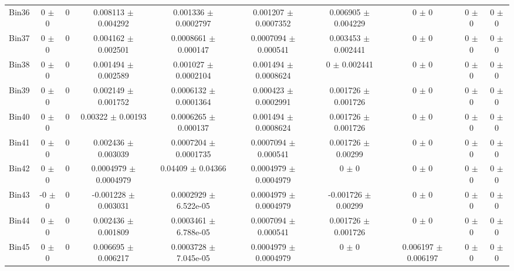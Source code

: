 \begin{tabular}{@{\extracolsep{4pt}}lccccccccc@{}}
     Bin36 & 0 $\pm$ 0 & 0 & 0.008113 $\pm$ 0.004292 & 0.001336 $\pm$ 0.0002797 & 0.001207 $\pm$ 0.0007352 & 0.006905 $\pm$ 0.004229 & 0 $\pm$ 0 & 0 $\pm$ 0 & 0 $\pm$ 0 \\ 
     Bin37 & 0 $\pm$ 0 & 0 & 0.004162 $\pm$ 0.002501 & 0.0008661 $\pm$ 0.000147 & 0.0007094 $\pm$ 0.000541 & 0.003453 $\pm$ 0.002441 & 0 $\pm$ 0 & 0 $\pm$ 0 & 0 $\pm$ 0 \\ 
     Bin38 & 0 $\pm$ 0 & 0 & 0.001494 $\pm$ 0.002589 & 0.001027 $\pm$ 0.0002104 & 0.001494 $\pm$ 0.0008624 & 0 $\pm$ 0.002441 & 0 $\pm$ 0 & 0 $\pm$ 0 & 0 $\pm$ 0 \\ 
     Bin39 & 0 $\pm$ 0 & 0 & 0.002149 $\pm$ 0.001752 & 0.0006132 $\pm$ 0.0001364 & 0.000423 $\pm$ 0.0002991 & 0.001726 $\pm$ 0.001726 & 0 $\pm$ 0 & 0 $\pm$ 0 & 0 $\pm$ 0 \\ 
     Bin40 & 0 $\pm$ 0 & 0 & 0.00322 $\pm$ 0.00193 & 0.0006265 $\pm$ 0.000137 & 0.001494 $\pm$ 0.0008624 & 0.001726 $\pm$ 0.001726 & 0 $\pm$ 0 & 0 $\pm$ 0 & 0 $\pm$ 0 \\ 
     Bin41 & 0 $\pm$ 0 & 0 & 0.002436 $\pm$ 0.003039 & 0.0007204 $\pm$ 0.0001735 & 0.0007094 $\pm$ 0.000541 & 0.001726 $\pm$ 0.00299 & 0 $\pm$ 0 & 0 $\pm$ 0 & 0 $\pm$ 0 \\ 
     Bin42 & 0 $\pm$ 0 & 0 & 0.0004979 $\pm$ 0.0004979 & 0.04409 $\pm$ 0.04366 & 0.0004979 $\pm$ 0.0004979 & 0 $\pm$ 0 & 0 $\pm$ 0 & 0 $\pm$ 0 & 0 $\pm$ 0 \\ 
     Bin43 & -0 $\pm$ 0 & 0 & -0.001228 $\pm$ 0.003031 & 0.0002929 $\pm$ 6.522e-05 & 0.0004979 $\pm$ 0.0004979 & -0.001726 $\pm$ 0.00299 & 0 $\pm$ 0 & 0 $\pm$ 0 & 0 $\pm$ 0 \\ 
     Bin44 & 0 $\pm$ 0 & 0 & 0.002436 $\pm$ 0.001809 & 0.0003461 $\pm$ 6.788e-05 & 0.0007094 $\pm$ 0.000541 & 0.001726 $\pm$ 0.001726 & 0 $\pm$ 0 & 0 $\pm$ 0 & 0 $\pm$ 0 \\ 
     Bin45 & 0 $\pm$ 0 & 0 & 0.006695 $\pm$ 0.006217 & 0.0003728 $\pm$ 7.045e-05 & 0.0004979 $\pm$ 0.0004979 & 0 $\pm$ 0 & 0.006197 $\pm$ 0.006197 & 0 $\pm$ 0 & 0 $\pm$ 0 \\ 
\hline\hline
  \end{tabular}
